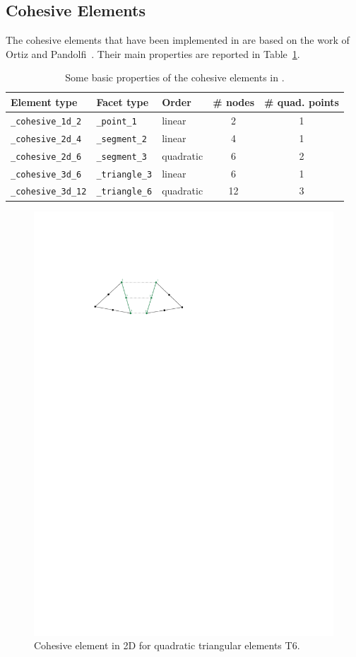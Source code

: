 
\subsection{Cohesive Elements}

The cohesive elements that have been implemented in \akantu are based
on the work of Ortiz and Pandolfi~\cite{ortiz1999}. Their main
properties are reported in Table~\ref{tab:coh:cohesive_elements}.

\begin{table}[!htb]
\begin{center}
\begin{tabular}{l|llcc}
\toprule
Element type & Facet type & Order & \# nodes & \# quad. points  \\
\midrule
\texttt{\_cohesive\_1d\_2} & \texttt{\_point\_1} & linear & 2 & 1  \\
\hline
\texttt{\_cohesive\_2d\_4} & \texttt{\_segment\_2} & linear & 4 & 1  \\
\texttt{\_cohesive\_2d\_6} & \texttt{\_segment\_3} & quadratic & 6 & 2  \\
\hline
\texttt{\_cohesive\_3d\_6} & \texttt{\_triangle\_3} & linear & 6 & 1  \\
\texttt{\_cohesive\_3d\_12} & \texttt{\_triangle\_6} & quadratic & 12 & 3  \\
\bottomrule
\end{tabular}
\end{center}
\caption{Some basic properties of the cohesive elements in \akantu.}
\label{tab:coh:cohesive_elements}
\end{table}

\begin{figure}
  \centering
  \includegraphics[width=.6\textwidth]{figures/cohesive2d}
  \caption{Cohesive element in 2D for quadratic triangular elements
    T6.}
  \label{fig:smm:coh:cohesive2d}
\end{figure}

